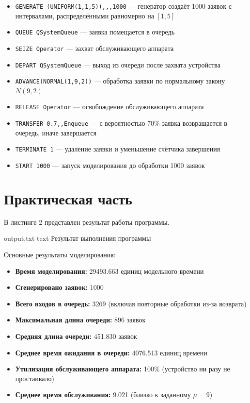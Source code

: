 \begin{itemize}
    \item \texttt{GENERATE (UNIFORM(1,1,5)),,,1000} — генератор создаёт 1000 заявок с интервалами, распределёнными равномерно на $[1, 5]$
    \item \texttt{QUEUE QSystemQueue} — заявка помещается в очередь
    \item \texttt{SEIZE Operator} — захват обслуживающего аппарата
    \item \texttt{DEPART QSystemQueue} — выход из очереди после захвата устройства
    \item \texttt{ADVANCE(NORMAL(1,9,2))} — обработка заявки по нормальному закону $N(9, 2)$
    \item \texttt{RELEASE Operator} — освобождение обслуживающего аппарата
    \item \texttt{TRANSFER 0.7,,Enqueue} — с вероятностью 70\% заявка возвращается в очередь, иначе завершается
    \item \texttt{TERMINATE 1} — удаление заявки и уменьшение счётчика завершения
    \item \texttt{START 1000} — запуск моделирования до обработки 1000 заявок
\end{itemize}

\section{Практическая часть}

В листинге 2 представлен результат работы программы.

    {output.txt}
    {text}
    {Результат выполнения программы}

Основные результаты моделирования:

\begin{itemize}
    \item \textbf{Время моделирования:} 29493.663 единиц модельного времени
    \item \textbf{Сгенерировано заявок:} 1000
    \item \textbf{Всего входов в очередь:} 3269 (включая повторные обработки из-за возврата)
    \item \textbf{Максимальная длина очереди:} 896 заявок
    \item \textbf{Средняя длина очереди:} 451.830 заявок
    \item \textbf{Среднее время ожидания в очереди:} 4076.513 единиц времени
    \item \textbf{Утилизация обслуживающего аппарата:} 100\% (устройство ни разу не простаивало)
    \item \textbf{Среднее время обслуживания:} 9.021 (близко к заданному $\mu = 9$)
\end{itemize}

